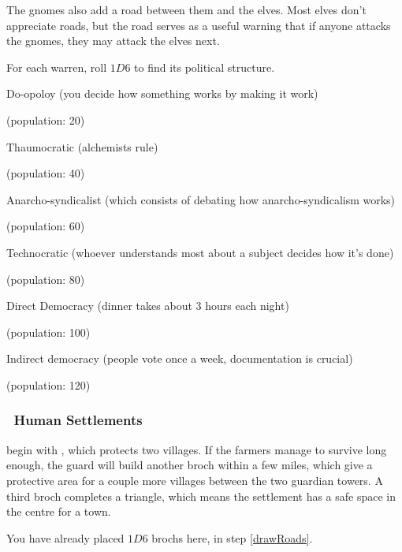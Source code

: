\begin{multicols}{2}
\begin{itemize}
  The gnomes also add a road between them and the elves.
  Most elves don't appreciate roads, but the road serves as a useful warning that if anyone attacks the gnomes, they may attack the elves next.
\end{itemize}

For each warren, roll $1D6$ to find its political structure.

\begin{dlist}
  \item
  Do-opoloy (you decide how something works by making it work)

  (population: 20)
  \item
  Thaumocratic (alchemists rule)

  (population: 40)
  \item
  Anarcho-syndicalist (which consists of debating how anarcho-syndicalism works)

  (population: 60)
  \item
  Technocratic (whoever understands most about a subject decides how it's done)

  (population: 80)
  \item
  Direct Democracy (dinner takes about 3 hours each night)

  (population: 100)
  \item
  Indirect democracy (people vote once a week, documentation is crucial)

  (population: 120)
\end{dlist}

\subsubsection[Human Settlements]{\Hu\ Human Settlements}
\label{humanPoint}
begin with , which protects two \glspl{village}.
If the farmers manage to survive long enough, the \gls{guard} will build another \gls{broch} within a few miles, which give a protective area for a couple more \glspl{village} between the two guardian towers.
A third \gls{broch} completes a triangle, which means the settlement has a safe space in the centre for a town.

You have already placed $1D6$ \glspl{broch} here, in step \vref{drawRoads}.


\end{multicols}
